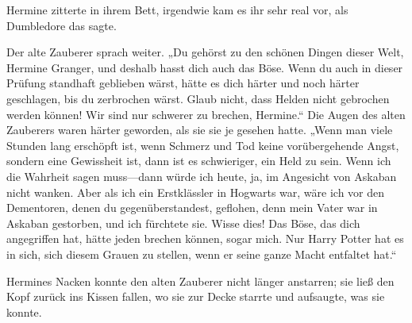 Hermine zitterte in ihrem Bett, irgendwie kam es ihr sehr real vor, als Dumbledore das sagte.

Der alte Zauberer sprach weiter. „Du gehörst zu den schönen Dingen dieser Welt, Hermine Granger, und deshalb hasst dich auch das Böse. Wenn du auch in dieser Prüfung standhaft geblieben wärst, hätte es dich härter und noch härter geschlagen, bis du zerbrochen wärst. Glaub nicht, dass Helden nicht gebrochen werden können! Wir sind nur schwerer zu brechen, Hermine.“
Die Augen des alten Zauberers waren härter geworden, als sie sie je gesehen hatte. „Wenn man viele Stunden lang erschöpft ist, wenn Schmerz und Tod keine vorübergehende Angst, sondern eine Gewissheit ist, dann ist es schwieriger, ein Held zu sein. Wenn ich die Wahrheit sagen muss—dann würde ich heute, ja, im Angesicht von Askaban nicht wanken. Aber als ich ein Erstklässler in Hogwarts war, wäre ich vor den Dementoren, denen du gegenüberstandest, geflohen, denn mein Vater war in Askaban gestorben, und ich fürchtete sie. Wisse dies! Das Böse, das dich angegriffen hat, hätte jeden brechen können, sogar mich. Nur Harry Potter hat es in sich, sich diesem Grauen zu stellen, wenn er seine ganze Macht entfaltet hat.“

Hermines Nacken konnte den alten Zauberer nicht länger anstarren; sie ließ den Kopf zurück ins Kissen fallen, wo sie zur Decke starrte und aufsaugte, was sie konnte.

